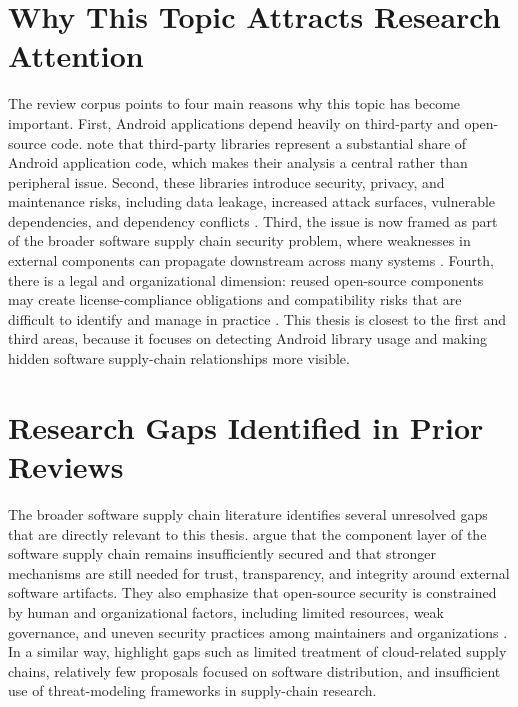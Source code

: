 \documentclass[12pt,a4paper]{report}
\begin{document}
\section{Why This Topic Attracts Research Attention}
The review corpus points to four main reasons why this topic has become important. First, Android applications depend heavily on third-party and open-source code. \textcite{zhanResearchThirdPartyLibraries2022} note that third-party libraries represent a substantial share of Android application code, which makes their analysis a central rather than peripheral issue. Second, these libraries introduce security, privacy, and maintenance risks, including data leakage, increased attack surfaces, vulnerable dependencies, and dependency conflicts \parencite{zhanResearchThirdPartyLibraries2022,senanayakeAndroidSourceCode2023}. Third, the issue is now framed as part of the broader software supply chain security problem, where weaknesses in external components can propagate downstream across many systems \parencite{reichertSoftwareSupplyChain2024,williamsResearchDirectionsSoftware2025}. Fourth, there is a legal and organizational dimension: reused open-source components may create license-compliance obligations and compatibility risks that are difficult to identify and manage in practice \parencite{liOpenSourceHidden2025}. This thesis is closest to the first and third areas, because it focuses on detecting Android library usage and making hidden software supply-chain relationships more visible.

\section{Research Gaps Identified in Prior Reviews}
The broader software supply chain literature identifies several unresolved gaps that are directly relevant to this thesis. \textcite{williamsResearchDirectionsSoftware2025} argue that the component layer of the software supply chain remains insufficiently secured and that stronger mechanisms are still needed for trust, transparency, and integrity around external software artifacts. They also emphasize that open-source security is constrained by human and organizational factors, including limited resources, weak governance, and uneven security practices among maintainers and organizations \parencite{williamsResearchDirectionsSoftware2025}. In a similar way, \textcite{reichertSoftwareSupplyChain2024} highlight gaps such as limited treatment of cloud-related supply chains, relatively few proposals focused on software distribution, and insufficient use of threat-modeling frameworks in supply-chain research.
\end{document}
